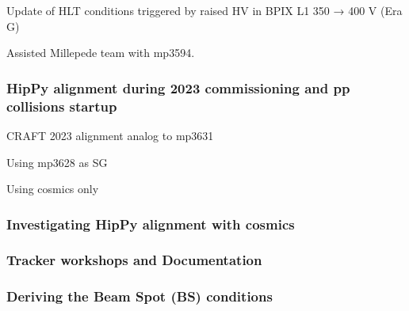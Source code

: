 Update of HLT conditions triggered by raised HV in BPIX L1 350 → 400 V (Era G) 

Assisted Millepede team with mp3594.


\subsubsection{HipPy alignment during 2023 commissioning and pp collisions startup}

CRAFT 2023 alignment analog to mp3631

Using mp3628 as SG

Using cosmics only


\subsubsection{Investigating HipPy alignment with cosmics}



\subsubsection{Tracker workshops and Documentation}


\subsubsection{Deriving the Beam Spot (BS) conditions}

